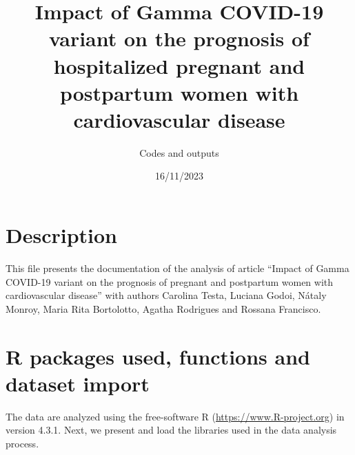 \documentclass[
]{article}
\title{Impact of Gamma COVID-19 variant on the prognosis of hospitalized
pregnant and postpartum women with cardiovascular disease}
\subtitle{Codes and outputs}
\author{}
\date{\vspace{-2.5em}16/11/2023}
\begin{document}
\maketitle

\hypertarget{description}{%
\section{Description}\label{description}}

This file presents the documentation of the analysis of article ``Impact
of Gamma COVID-19 variant on the prognosis of pregnant and postpartum
women with cardiovascular disease'' with authors Carolina Testa, Luciana
Godoi, Nátaly Monroy, Maria Rita Bortolotto, Agatha Rodrigues and
Rossana Francisco.

\hypertarget{r-packages-used-functions-and-dataset-import}{%
\section{R packages used, functions and dataset
import}\label{r-packages-used-functions-and-dataset-import}}

The data are analyzed using the free-software R
(\url{https://www.R-project.org}) in version 4.3.1. Next, we present and
load the libraries used in the data analysis process.
\end{document}

